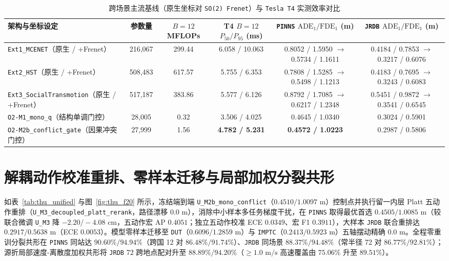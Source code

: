 \documentclass[UTF8,a4paper,12pt,openany,oneside]{ctexrep}
\begin{document}
\begin{table}[!htbp]
\centering
\caption{跨场景主流基线（原生坐标对 \texttt{SO(2) Frenet}）与 \texttt{Tesla T4} 实测效率对比}
\label{tab:thu_ext}
\footnotesize
\begin{tabular}{lccccc}
\toprule
架构与坐标设定 & 参数量 & $B{=}12$ MFLOPs & T4 $B{=}12$ $P_{50}/P_{95}$ (ms) & \texttt{PINNS} $\text{ADE}_1/\text{FDE}_1$ (m) & \texttt{JRDB} $\text{ADE}_1/\text{FDE}_1$ (m) \\
\midrule
\texttt{Ext1\_MCENET}（原生 / +Frenet） & 216,067 & 299.44 & 6.058 / 10.063 & 0.8052 / 1.5950 $\to$ 0.5734 / 1.1611 & 0.4184 / 0.7853 $\to$ 0.3217 / 0.6076 \\
\texttt{Ext2\_HST}（原生 / +Frenet） & 508,483 & 617.57 & 5.755 / 6.353 & 0.7808 / 1.5285 $\to$ 0.5498 / 1.1213 & 0.4183 / 0.7695 $\to$ 0.3243 / 0.6083 \\
\texttt{Ext3\_SocialTransmotion}（原生 / +Frenet） & 517,187 & 383.86 & 5.577 / 6.126 & 0.8792 / 1.7085 $\to$ 0.6217 / 1.2348 & 0.5451 / 0.9872 $\to$ 0.3541 / 0.6545 \\
\texttt{O2-M1\_mono\_q}（结构单调门控） & 28,005 & 0.32 & 3.506 / 4.025 & 0.4645 / 1.0340 & 0.3024 / 0.5901 \\
\texttt{O2-M2b\_conflict\_gate}（因果冲突门控） & 27,999 & 1.56 & \textbf{4.782 / 5.231} & \textbf{0.4572 / 1.0223} & 0.2987 / 0.5806 \\
\bottomrule
\end{tabular}
\end{table}

\section{解耦动作校准重排、零样本迁移与局部加权分裂共形}
如表~\ref{tab:thu_unified} 与图~\ref{fig:thu_f20} 所示，冻结端到端 \texttt{U\_M2b\_mono\_conflict}（$0.4510 / 1.0097\text{ m}$）控制点并执行留一内层 Platt 五动作重排（\texttt{U\_M3\_decoupled\_platt\_rerank}，路径漂移 $0.0\text{ m}$），消除中小样本多任务梯度干扰，在 \texttt{PINNS} 取得最优首选 $0.4505 / 1.0085\text{ m}$（较联合微调 \texttt{U\_M3} 降 $-2.20 / -4.08\text{ cm}$，五动作宏 AP $0.4051$；独立五动作校准 ECE $0.0349$、宏 F1 $0.3911$），大样本 \texttt{JRDB} 联合重排达 $0.2917 / 0.5638\text{ m}$（ECE $0.0053$）。模型零样本迁移至 \texttt{DUT}（$0.6096 / 1.2859\text{ m}$）与 \texttt{IMPTC}（$0.2413 / 0.5923\text{ m}$）五轴摆动精确 $0.0\text{ m}$。全程零重训分裂共形在 \texttt{PINNS} 同站达 $90.60\% / 94.94\%$（跨国 12 对 $86.48\% / 91.74\%$）、\texttt{JRDB} 同场景 $88.37\% / 94.48\%$（常半径 72 对 $86.77\% / 92.81\%$）；源折局部速度-离散度加权共形将 \texttt{JRDB} 72 跨地点配对升至 $88.89\% / 94.20\%$（$\ge 1.0\text{ m/s}$ 高速覆盖由 $75.06\%$ 升至 $89.51\%$）。
\end{document}

